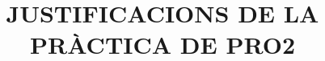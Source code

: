 \documentclass[a4paper,12pt]{article}
\begin{document}
\title{JUSTIFICACIONS DE LA PRÀCTICA DE PRO2}
\end{document}

